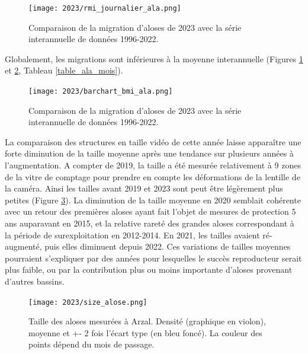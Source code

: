 \documentclass[11pt,twocolumn,titlepage,twoside]{article}\usepackage[]{graphicx}\usepackage[]{color}
\begin{document}

 


\begin{figure}[htpb]
\centering
\texttt{[image: 2023/rmi\_journalier\_ala.png]} 
\caption{Comparaison de la migration d'aloses de 2023 avec la série
interannuelle de données 1996-2022.}
\label{rmi_journalier_ala}
\end{figure}


Globalement, les migrations sont inférieures à la
moyenne interannuelle (Figures
\ref{rmi_journalier_ala} et \ref{barchart_bmi_ala}, Tableau \ref{table_ala_mois}).

\begin{figure}[htpb]
\centering
\texttt{[image: 2023/barchart\_bmi\_ala.png]} 
\caption{Comparaison de la migration d'aloses de 2023 avec la série
interannuelle de données 1996-2022.}
\label{barchart_bmi_ala}
\end{figure}

La comparaison des structures en taille vidéo de cette année laisse apparaître
une forte diminution de la taille moyenne après une tendance sur plusieurs
années à l'augmentation.
A compter de 2019, la taille a été mesurée relativement à 9 zones de la vitre de
comptage pour prendre en compte les déformations de la lentille de la caméra. Ainsi les tailles avant 2019 et 2023
sont peut être légèrement plus petites (Figure \ref{size_alose}).
La diminution de la taille moyenne en 2020 semblait cohérente avec un retour des
premières aloses ayant fait l'objet de mesures de protection 5 ans auparavant en
2015, et la relative rareté des grandes aloses correspondant à la période de
surexploitation en 2012-2014. En 2021, les tailles avaient ré-augmenté,
puis elles diminuent depuis 2022. Ces variations de tailles moyennes
pourraient s'expliquer par des années pour lesquelles le succès reproducteur
serait plus faible, ou par la contribution plus ou moins importante d'aloses
provenant d'autres bassins.



\begin{figure}[htpb]
\centering
\texttt{[image: 2023/size\_alose.png]}
\caption{Taille des aloses mesurées à Arzal. Densité (graphique en violon),
moyenne et +- 2 fois l'écart type (en bleu foncé). La couleur des points dépend
du mois de passage.}
\label{size_alose}
\end{figure}
\end{document}
